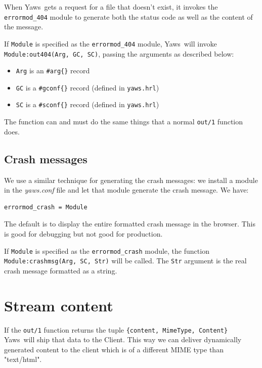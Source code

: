 \documentclass[11pt,oneside,english]{book}
\newcommand{\Yaws}            %
        {{\sc Yaws}}
\begin{document}
When \Yaws\ gets a request for a file that doesn't exist, it invokes
the \verb+errormod_404+ module to generate both the status code as
well as the content of the message.

If \verb+Module+ is specified as the \verb+errormod_404+ module,
\Yaws\ will invoke \verb+Module:out404(Arg, GC, SC)+, passing the
arguments as described below:

\begin{itemize}
\item \verb+Arg+ is an \verb+#arg{}+ record

\item \verb+GC+ is a \verb+#gconf{}+ record (defined in \verb+yaws.hrl+)

\item \verb+SC+ is a \verb+#sconf{}+ record (defined in
  \verb+yaws.hrl+)
\end{itemize}

The function can and must do the same things that a normal
\verb+out/1+ function does.


\subsection{Crash messages}

We use a similar technique for generating the crash messages: we
install a module in the \textit{yaws.conf} file and let that module
generate the crash message.  We have:

\begin{verbatim}
errormod_crash = Module
\end{verbatim}

The default is to display the entire formatted crash message in the
browser.  This is good for debugging but not good for production.

If \verb+Module+ is specified as the \verb+errormod_crash+ module, the
function \verb+Module:crashmsg(Arg, SC, Str)+ will be called.  The
\verb+Str+ argument is the real crash message formatted as a string.

\section{Stream content}

If the \verb+out/1+ function returns the tuple
\verb+{content, MimeType, Content}+ \Yaws\ will ship that data to the
Client. This way we can deliver dynamically generated content to the
client which is of a different MIME type than "text/html".
\end{document}
